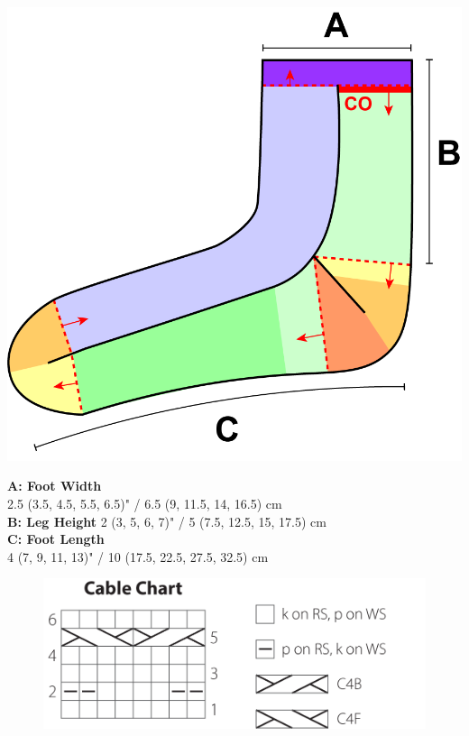 \documentclass[12pt]{article}
\begin{document}
\begin{multicols}{2}
\vspace{-1em}
\begin{center}
\includegraphics[width=.9\linewidth]{Planetes_schematic.png}
\end{center}

{\fontsize{10pt}{12} \selectfont
{\small\textbf{\textsf{A: Foot Width}}} \\\hspace{.2em} 2.5 (3.5, 4.5, 5.5, 6.5)" / 6.5 (9, 11.5, 14, 16.5) cm \\

{\small\textbf{\textsf{B: Leg Height}}} \hspace{.5em} 2 (3, 5, 6, 7)" / 5 (7.5, 12.5, 15, 17.5) cm \\

{\small\textbf{\textsf{C: Foot Length}}} \\\hspace{.5em} 4 (7, 9, 11, 13)" / 10 (17.5, 22.5, 27.5, 32.5) cm \\
}


\end{multicols}

\begin{figure}
\includegraphics[width=0.8\linewidth]{Planetes_chart.png} \hspace{1.5in}
\vspace{-1in}
\end{figure} \leavevmode
\end{document}
